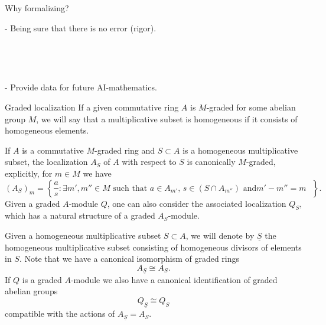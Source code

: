 \documentclass[9pt]{beamer}
\begin{document}
\begin{frame}{Why formalizing? }

- Being sure that there is no error (rigor).

$~~$

$~~$

- Provide data for future AI-mathematics.




\end{frame}


\begin{frame}{Graded localization}
If a given commutative ring $A$ is $M$-graded for some abelian group $M$, we will say that a multiplicative subset is homogeneous if it consists of homogeneous elements. 

If $A$ is a commutative $M$-graded ring and $S \subset A$ is a homogeneous multiplicative subset, the localization $A_S$ of $A$ with respect to $S$ is canonically $M$-graded, explicitly, for $m \in M$ we have
\[
( A_S)_m =  \left\{ \frac{a}{s} : \exists m', m'' \in M \text{ such that }  a \in A_{m'}, \, s \in (S \cap A_{m''}) \text{ and
$m'-m'' =m$ }\right\}.
\]
Given a graded $A$-module $Q$, one can also consider the associated localization $Q_S$, which has a natural structure of a graded $A_S$-module.

Given a homogeneous multiplicative subset $S \subset A$, we will denote by $\underline{S}$ the homogeneous multiplicative subset consisting of homogeneous divisors of elements in $S$. Note that we have a canonical isomorphism of graded rings
\begin{equation}
\label{eqn:isom-localizations}
 A_{ \underline{S}} \cong A_{S}.
\end{equation}
If $Q$ is a graded $A$-module we also have a canonical identification of graded abelian groups 
\begin{equation}
\label{eqn:isom-localizations-modules}
Q_{\underline{S}} \cong Q_S
\end{equation}
compatible with the actions of $A_{ \underline{S}} = A_{S}$.

\end{frame}
\end{document}
